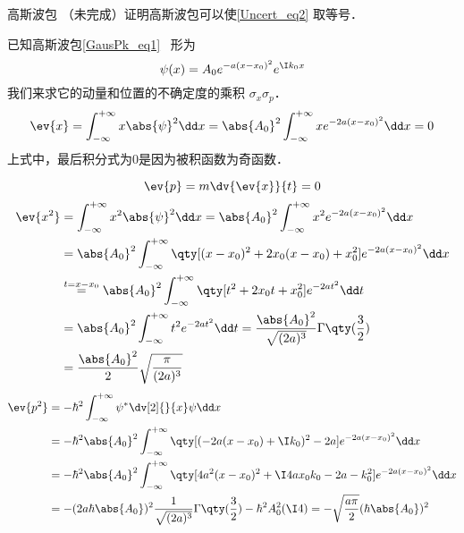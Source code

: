 \begin{example}{高斯波包}\label{Uncert_ex1}
（未完成）证明高斯波包可以使\autoref{Uncert_eq2} 取等号．

已知高斯波包\autoref{GausPk_eq1}~ 形为
\begin{equation}
\psi(x)=A_0e^{-a(x-x_0)^2}e^{\I k_0x}
\end{equation}
我们来求它的动量和位置的不确定度的乘积 $\sigma_x\sigma_p$．
\begin{equation}
\ev{x}=\int_{-\infty}^{+\infty}x\abs{\psi}^2\dd x=\abs{A_0}^2\int_{-\infty}^{+\infty}xe^{-2a(x-x_0)^2}\dd x=0
\end{equation}
上式中，最后积分式为0是因为被积函数为奇函数．

\begin{equation}
\ev{p}=m\dv{\ev{x}}{t}=0
\end{equation}
\begin{equation}
\begin{aligned}
\ev{x^2}&=\int_{-\infty}^{+\infty}x^2\abs{\psi}^2\dd x=\abs{A_0}^2\int_{-\infty}^{+\infty}x^2e^{-2a(x-x_0)^2}\dd x\\
&=\abs{A_0}^2\int_{-\infty}^{+\infty}\qty[(x-x_0)^2+2x_0(x-x_0)+x_0^2]e^{-2a(x-x_0)^2}\dd x\\
&\overset{t=x-x_0}{=}\abs{A_0}^2\int_{-\infty}^{+\infty}\qty[t^2+2x_0t+x_0^2]e^{-2at^2}\dd t\\
&=\abs{A_0}^2\int_{-\infty}^{+\infty}t^2e^{-2at^2}\dd t
=\frac{\abs{A_0}^2}{\sqrt{(2a)^3}}\Gamma\qty(\frac{3}{2})\\
&=\frac{\abs{A_0}^2}{2}\sqrt{\frac{\pi}{(2a)^3}}
\end{aligned}
\end{equation}
\begin{equation}
\begin{aligned}
\ev{p^2}&=-\hbar^2 \int_{-\infty}^{+\infty}\psi^{*}\dv[2]{}{x}\psi\dd x\\
&=-\hbar^2\abs{A_0}^2\int_{-\infty}^{+\infty}\qty[(-2a(x-x_0)+\I k_0)^2-2a]e^{-2a(x-x_0)^2}\dd x\\
&=-\hbar^2\abs{A_0}^2\int_{-\infty}^{+\infty}\qty[4a^2(x-x_0)^2+\I 4ax_0k_0-2a-k_0^2]e^{-2a(x-x_0)^2}\dd x\\
&=-(2a\hbar\abs{A_0})^2\frac{1}{\sqrt{(2a)^3}}\Gamma\qty(\frac{3}{2})-\hbar^2 A_0^2(\I 4)=-\sqrt{\frac{a\pi}{2}}(\hbar\abs{A_0})^2
\end{aligned}
\end{equation}

\end{example}

